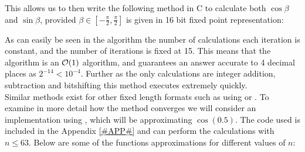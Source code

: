 {This allows us to then write the following method in C to calculate both \(\cos\beta\) and \(\sin\beta\), provided \(\beta \in [-\tfrac{\pi}{2}, \tfrac{\pi}{2}]\) is given in 16 bit fixed point representation:


As can easily be seen in the algorithm the number of calculations each iteration is constant, and the number of iterations is fixed at 15. This means that the algorithm is an \(\mathcal{O}(1)\) algorithm, and guarantees an answer accurate to 4 decimal places as \(2^{-14} < 10^{-4}\). Further as the only calculations are integer addition, subtraction and bitshifting this method executes extremely quickly.\\

Similar methods exist for other fixed length formats such as using  or . To examine in more detail how the method converges we will consider an implementation using , which will be approximating \(\cos(0.5)\). The code used is included in the Appendix \ref{#APP#} and can perform the calculations with \(n \le 63\). Below are some of the functions approximations for different values of \(n\):

}
